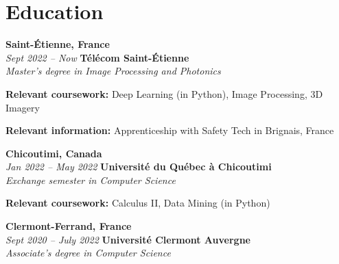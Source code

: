     
    \section{Education}
       \begin{twocolentry}{
            \textbf{Saint-Étienne, France}\\
            \textit{Sept 2022 – Now}
            }{
            \textbf{Télécom Saint-Étienne}\\
            \textit{Master’s degree in Image Processing and Photonics}%
            }
        \end{twocolentry}


        \begin{onecolentry}
            \begin{highlights}
                \item \textbf{Relevant coursework:} Deep Learning (in Python), Image Processing, 3D Imagery
                \item \textbf{Relevant information:} Apprenticeship with Safety Tech in Brignais, France
            \end{highlights}
        \end{onecolentry}

		\begin{twocolentry}{
			\textbf{Chicoutimi, Canada} \\
			\textit{Jan 2022 – May 2022}
            }{
            \textbf{Université du Québec à Chicoutimi} \\
            \textit{Exchange semester in Computer Science}
            }
        \end{twocolentry}

        \begin{onecolentry}
            \begin{highlights}
                \item \textbf{Relevant coursework:} Calculus II, Data Mining (in Python)
            \end{highlights}
        \end{onecolentry}

		\begin{twocolentry}{
			\textbf{Clermont-Ferrand, France} \\
			\textit{Sept 2020 – July 2022}
            }{
            \textbf{Université Clermont Auvergne} \\
            \textit{Associate's degree in Computer Science}
            }
        \end{twocolentry}

